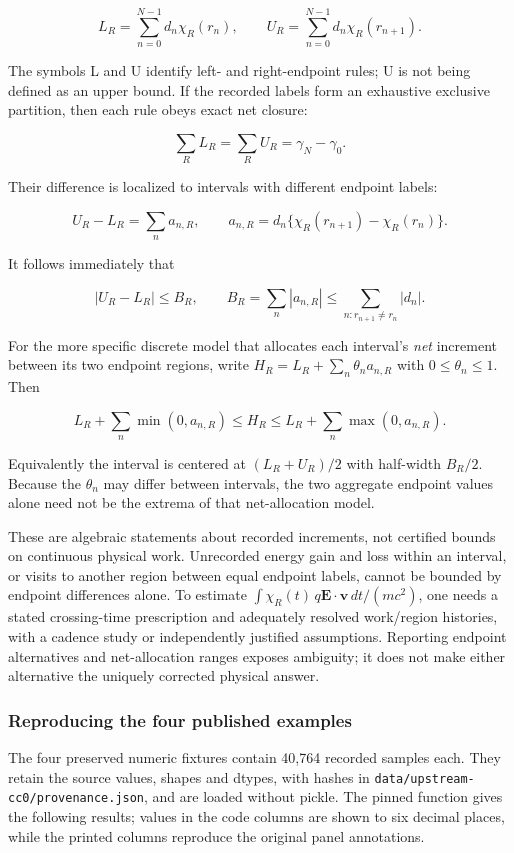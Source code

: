 \[
L_R=\sum_{n=0}^{N-1}d_n\chi_R(r_n),\qquad
U_R=\sum_{n=0}^{N-1}d_n\chi_R(r_{n+1}).
\]

The symbols L and U identify left- and right-endpoint rules; U is not
being defined as an upper bound. If the recorded labels form an
exhaustive exclusive partition, then each rule obeys exact net closure:

\[
\sum_R L_R=\sum_R U_R=\gamma_N-\gamma_0.
\]

Their difference is localized to intervals with different endpoint
labels:

\[
U_R-L_R=\sum_n a_{n,R},\qquad
a_{n,R}=d_n\{\chi_R(r_{n+1})-\chi_R(r_n)\}.
\]

It follows immediately that

\[
|U_R-L_R|\leq B_R,\qquad
B_R=\sum_n|a_{n,R}|
\leq\sum_{n:r_{n+1}\ne r_n}|d_n|.
\]

For the more specific discrete model that allocates each interval's
\emph{net} increment between its two endpoint regions, write
\(H_R=L_R+\sum_n\theta_n a_{n,R}\) with \(0\leq\theta_n\leq1\). Then

\[
L_R+\sum_n\min(0,a_{n,R})\leq H_R
\leq L_R+\sum_n\max(0,a_{n,R}).
\]

Equivalently the interval is centered at \((L_R+U_R)/2\) with half-width
\(B_R/2\). Because the \(\theta_n\) may differ between intervals, the
two aggregate endpoint values alone need not be the extrema of that
net-allocation model.

These are algebraic statements about recorded increments, not certified
bounds on continuous physical work. Unrecorded energy gain and loss
within an interval, or visits to another region between equal endpoint
labels, cannot be bounded by endpoint differences alone. To estimate
\(\int \chi_R(t)\,q\mathbf E\cdot\mathbf v\,dt/(mc^2)\), one needs a
stated crossing-time prescription and adequately resolved work/region
histories, with a cadence study or independently justified assumptions.
Reporting endpoint alternatives and net-allocation ranges exposes
ambiguity; it does not make either alternative the uniquely corrected
physical answer.

\subsubsection{Reproducing the four published
examples}\label{reproducing-the-four-published-examples}

The four preserved numeric fixtures contain 40,764 recorded samples
each. They retain the source values, shapes and dtypes, with hashes in
\nolinkurl{data/upstream-cc0/provenance.json}, and are loaded without
pickle. The pinned function gives the following results; values in the
code columns are shown to six decimal places, while the printed columns
reproduce the original panel annotations.

